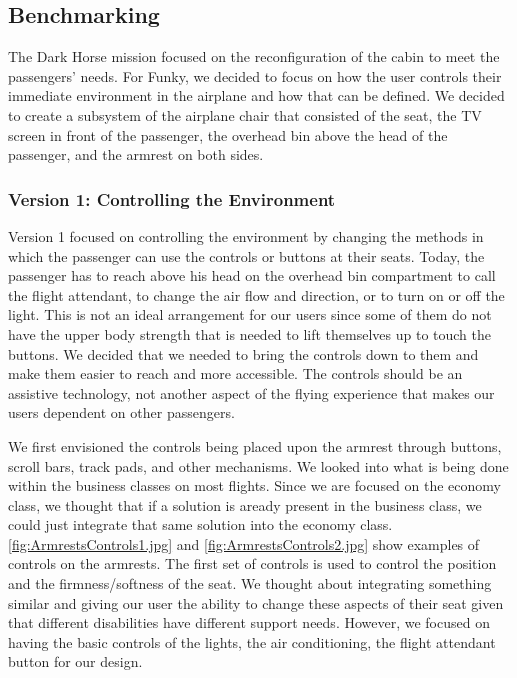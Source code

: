 \subsection{Benchmarking}

The Dark Horse mission focused on the reconfiguration of the cabin to meet the passengers' needs.  For Funky, we decided to focus on how the user controls their immediate environment in the airplane and how that can be defined.  We decided to create a subsystem of the airplane chair that consisted of the seat, the TV screen in front of the passenger, the overhead bin above the head of the passenger, and the armrest on both sides.

\subsubsection{Version 1: Controlling the Environment} 
Version 1 focused on controlling the environment by changing the methods in which the passenger can use the controls or buttons at their seats.  Today, the passenger has to reach above his head on the overhead bin compartment to call the flight attendant, to change the air flow and direction, or to turn on or off the light.  This is not an ideal arrangement for our users since some of them do not have the upper body strength that is needed to lift themselves up to touch the buttons.  We decided that we needed to bring the controls down to them and make them easier to reach and more accessible.  The controls should be an assistive technology, not another aspect of the flying experience that makes our users dependent on other passengers.   

We first envisioned the controls being placed upon the armrest through buttons, scroll bars, track pads, and other mechanisms. We looked into what is being done within the business classes on most flights.  Since we are focused on the economy class, we thought that if a solution is aready present in the business class, we could just integrate that same solution into the economy class. \ref{fig:ArmrestsControls1.jpg} and \ref{fig:ArmrestsControls2.jpg} show examples of controls on the armrests.  The first set of controls is used to control the position and the firmness/softness of the seat.  We thought about integrating  something similar and giving our user the ability to change these aspects of their seat given that different disabilities have different support needs. However, we focused on having the basic controls of the lights, the air conditioning, the flight attendant button for our design. 

